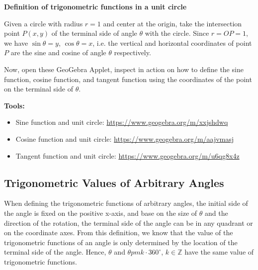 \documentclass{report}
\begin{document}
\begin{explore}
    
    \noindent \textbf{Definition of trigonometric functions in a unit circle}

    \noindent Given a circle with radius $r=1$ and center at the origin, take the intersection point $P(x, y)$ of the terminal side of angle $\theta$ with the circle. Since $r = OP = 1$, we have $\sin\theta = y$, $\cos\theta = x$, i.e. the vertical and horizontal coordinates of point $P$ are the sine and cosine of angle $\theta$ respectively.

    \noindent Now, open these GeoGebra Applet, inspect in action on how to define the sine function, cosine function, and tangent function using the coordinates of the point on the terminal side of $\theta$.

    \noindent \textbf{Tools:}
    \vspace{-1em}
    \begin{itemize}[leftmargin=*]
        \item Sine function and unit circle: \url{https://www.geogebra.org/m/xxjshdwq}
        \item Cosine function and unit circle: \url{https://www.geogebra.org/m/aajvmasj}
        \item Tangent function and unit circle: \url{https://www.geogebra.org/m/u6qg8x4z}
    \end{itemize}
\end{explore}

\vspace{-0.5em}
\subsection*{Trigonometric Values of Arbitrary Angles}

When defining the trigonometric functions of arbitrary angles, the initial side of the angle is fixed on the positive x-axis, and base on the size of $\theta$ and the direction of the rotation, the terminal side of the angle can be in any quadrant or on the coordinate axes. From this definition, we know that the value of the trigonometric functions of an angle is only determined by the location of the terminal side of the angle. Hence, $\theta$ and $\theta pm k \cdot 360^\circ$, $k \in \mathbb{Z}$ have the same value of trigonometric functions.
\end{document}
